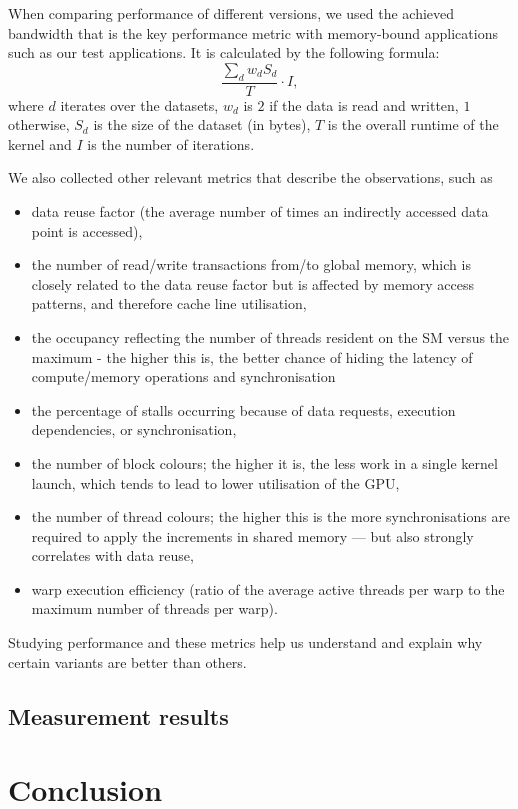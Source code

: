 When comparing performance of different versions, we used the achieved bandwidth
that is the key performance metric with memory-bound applications such as our
test applications. It is calculated by the following formula: $$\frac{\sum_{d}
w_dS_d}{T} \cdot I,$$ where $d$ iterates over the datasets, $w_d$ is $2$ if the
data is read and written, $1$ otherwise, $S_d$ is the size of the dataset (in
bytes), $T$ is the overall runtime of the kernel and $I$ is the number of
iterations.

We also collected other relevant metrics that describe the observations, such as 
\begin{itemize}
  \item data reuse factor (the average number of times an indirectly accessed
    data point is accessed),
  \item the number of read/write transactions from/to global memory, which is
    closely related to the data reuse factor but is affected by memory access
    patterns, and therefore cache line utilisation,
  \item the occupancy reflecting the number of threads resident on the SM versus
    the maximum - the higher this is, the better chance of hiding the latency of
    compute/memory operations and synchronisation
  \item the percentage of stalls occurring because of data requests, execution
    dependencies, or synchronisation,
   \item the number of block colours; the higher it is, the less work in a
     single kernel launch, which tends to lead to lower utilisation of the GPU,
  \item the number of thread colours; the higher this is the more
    synchronisations are required to apply the increments in shared memory ---
    but also strongly correlates with data reuse,
  \item warp execution efficiency (ratio of the average active threads per warp
    to the maximum number of threads per warp).
\end{itemize}
Studying performance and these metrics help us understand and explain why
certain variants are better than others.

\subsection{Measurement results}\label{measurement-results}



\section{Conclusion}\label{conclusion}

